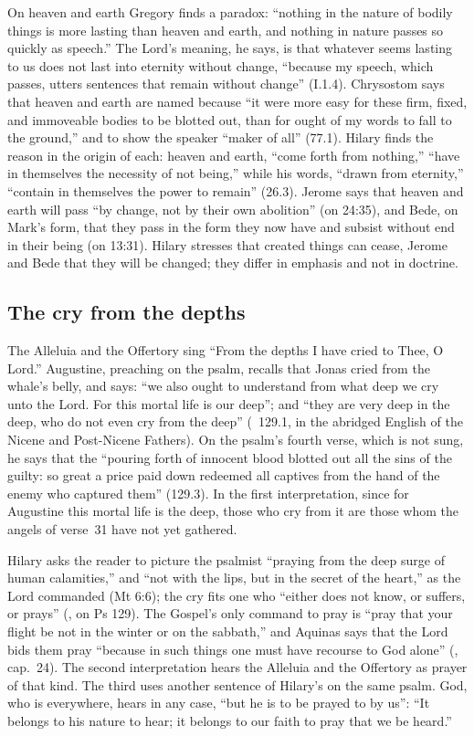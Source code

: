On heaven and earth Gregory finds a paradox: ``nothing in the nature of
bodily things is more lasting than heaven and earth, and nothing in nature
passes so quickly as speech.'' The Lord's meaning, he says, is that whatever
seems lasting to us does not last into eternity without change, ``because my
speech, which passes, utters sentences that remain without change'' (I.1.4).
Chrysostom says that heaven and earth are named because ``it were more easy
for these firm, fixed, and immoveable bodies to be blotted out, than for ought
of my words to fall to the ground,'' and to show the speaker ``maker of all''
(77.1). Hilary finds the reason in the origin of each: heaven and earth,
``come forth from nothing,'' ``have in themselves the necessity of not
being,'' while his words, ``drawn from eternity,'' ``contain in themselves the
power to remain'' (26.3). Jerome says that heaven and earth will pass ``by
change, not by their own abolition'' (on 24:35), and Bede, on Mark's form,
that they pass in the form they now have and subsist without end in their
being (on 13:31). Hilary stresses that created things can cease, Jerome and
Bede that they will be changed; they differ in emphasis and not in doctrine.

\subsection{The cry from the depths}

The Alleluia and the Offertory sing ``From the depths I have cried to Thee, O
Lord.'' Augustine, preaching on the psalm, recalls that Jonas cried from the
whale's belly, and says: ``we also ought to understand from what deep we cry
unto the Lord. For this mortal life is our deep''; and ``they are very deep in
the deep, who do not even cry from the deep'' (~129.1, in the abridged English of the Nicene and Post-Nicene
Fathers). On the psalm's fourth verse, which is not sung, he says that the
``pouring forth of innocent blood blotted out all the sins of the guilty: so
great a price paid down redeemed all captives from the hand of the enemy who
captured them'' (129.3). In the first interpretation, since for Augustine this
mortal life is the deep, those who cry from it are those whom the angels of
verse~31 have not yet gathered.

Hilary asks the reader to picture the psalmist ``praying from the deep surge
of human calamities,'' and ``not with the lips, but in the secret of the
heart,'' as the Lord commanded (Mt 6:6); the cry fits one who ``either does
not know, or suffers, or prays'' (, on Ps 129).
The Gospel's only command to pray is ``pray that your flight be not in the
winter or on the sabbath,'' and Aquinas says that the Lord bids them pray
``because in such things one must have recourse to God alone'' (, cap.~24). The second interpretation hears the Alleluia and the Offertory as prayer of that kind.
The third uses another sentence of Hilary's on the same psalm. God, who is
everywhere, hears in any case, ``but he is to be prayed to by us'': ``It
belongs to his nature to hear; it belongs to our faith to pray that we be
heard.''

